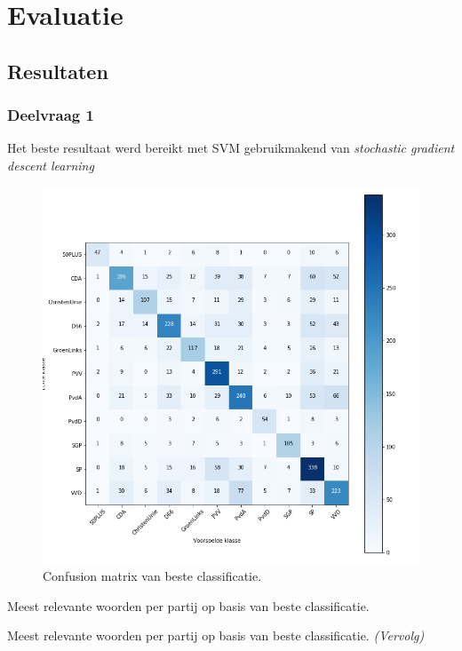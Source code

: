 \section{Evaluatie}
\label{sec:eva}

\subsection{Resultaten}

\subsubsection{Deelvraag 1}
Het beste resultaat werd bereikt met SVM gebruikmakend van \textit{stochastic gradient descent learning}

\begin{figure}
  \caption{Confusion matrix van beste classificatie.}
  \centering
    \includegraphics[width=0.6\paperwidth]{Verslag/confusionmatrix.png}
\end{figure}

\begin{table}[H] 
\caption{Meest relevante woorden per partij op basis van beste classificatie.} 
\label{tab:MostImportantWordsWithoutNames} 
\centering 
 
\end{table} 
\addtocounter{table}{-1} 
\begin{table}[H] 
\caption{Meest relevante woorden per partij op basis van beste classificatie. \emph{(Vervolg)}} 
\centering 
 
\end{table}

